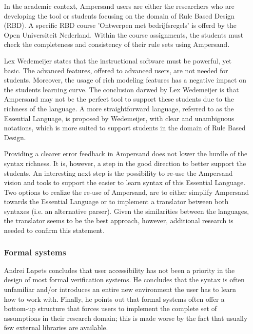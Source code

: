 %
In the academic context, Ampersand users are either the researchers who are developing the tool or students focusing on the domain of Rule Based Design (RBD).
A specific RBD course 'Ontwerpen met bedrijfsregels' is offerd by the Open Universiteit Nederland.
Within the course assignments, the students must check the completeness and consistency of their rule sets using Ampersand. 

Lex Wedemeijer  states that the instructional software must be powerful, yet basic.
The advanced features, offered to advanced users, are not needed for students.
Moreover, the usage of rich modeling features has a negative impact on the students learning curve.
The conclusion darwed by Lex Wedemeijer is that Ampersand may not be the perfect tool to support these students due to the richness of the language.
A more straightforward language, referred to as the Essential Language, is proposed by Wedemeijer, with clear and unambiguous notations, which is more suited to support students in the domain of Rule Based Design.

Providing a clearer error feedback in Ampersand does not lower the hurdle of the syntax richness.
It is, however, a step in the good direction to better support the students. 
An interesting next step is the possibility to re-use the Ampersand vision and tools to support the easier to learn syntax of this Essential Language.
Two options to realize the re-use of Ampersand, are to either simplify Ampersand towards the Essential Language or to implement a translator between both syntaxes (i.e. an alternative parser).
Given the similarities between the languages, the translator seems to be the best approach, however, additional research is needed to confirm this statement.

\subsubsection{Formal systems}
Andrei Lapets  concludes that user accessibility has not been a priority in the design of most formal verification systems.
He concludes that the syntax is often unfamiliar and/or introduces an entire new environment the user has to learn how to work with.
Finally, he points out that formal systems often offer a bottom-up structure that forces users to implement the complete set of assumptions in their research domain; this is made worse by the fact that usually few external libraries are available.

